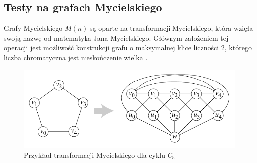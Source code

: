 \documentclass[10pt,a4paper]{article}
\begin{document}
	\subsection{Testy na grafach Mycielskiego}
	
	Grafy Mycielskiego $M(n)$ są oparte na transformacji Mycielskiego, która wzięła swoją nazwę od matematyka Jana Mycielskiego. Głównym założeniem tej operacji jest możliwość konstrukcji grafu o maksymalnej klice liczności $2$, którego liczba chromatyczna jest nieskończenie wielka \cite{mycielskian}.
	
		\begin{figure}[H]
		\begin{center}
			\includegraphics[width=\textwidth]{images/Groetzsch-as-Mycielski.png}
			\caption{Przykład transformacji Mycielskiego dla cyklu $C_{5}$}
		\end{center}
	\end{figure}
\end{document}
